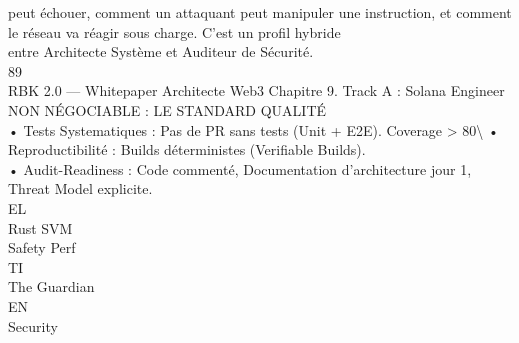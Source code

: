 peut échouer, comment un attaquant peut manipuler une instruction, et comment le réseau va réagir sous charge. C’est un profil hybride\\
entre Architecte Système et Auditeur de Sécurité.\\
\vspace{0.5em}
\vspace{0.5em}
\vspace{0.5em}
\vspace{0.5em}
89\\
RBK 2.0 — Whitepaper Architecte Web3                                                                    Chapitre 9. Track A : Solana Engineer\\
\vspace{0.5em}
\vspace{0.5em}
\vspace{0.5em}
NON NÉGOCIABLE : LE STANDARD QUALITÉ\\
• Tests Systematiques : Pas de PR sans tests (Unit + E2E). Coverage \textgreater{} 80\textbackslash{}%
\vspace{0.5em}
• Reproductibilité : Builds déterministes (Verifiable Builds).\\
\vspace{0.5em}
• Audit-Readiness : Code commenté, Documentation d’architecture jour 1, Threat Model explicite.\\
\vspace{0.5em}
\vspace{0.5em}
\vspace{0.5em}
\vspace{0.5em}
EL\\
Rust                      SVM\\
Safety                     Perf\\
\vspace{0.5em}
\vspace{0.5em}
\vspace{0.5em}
\vspace{0.5em}
TI\\
The Guardian\\
\vspace{0.5em}
\vspace{0.5em}
\vspace{0.5em}
\vspace{0.5em}
EN\\
Security\\
\vspace{0.5em}
\vspace{0.5em}
